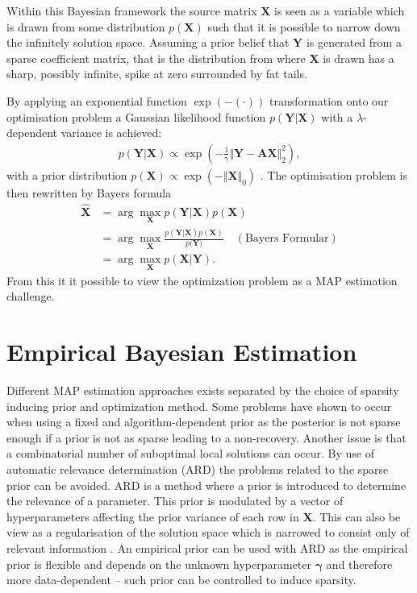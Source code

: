 Within this Bayesian framework the source matrix $\mathbf{X}$ is seen as a variable which is drawn from some distribution $p(\mathbf{X})$ such that it is possible to narrow down the infinitely solution space. 
Assuming a prior belief that $\textbf{Y}$ is generated from a sparse coefficient matrix, that is the distribution from where $\textbf{X}$ is drawn has a sharp, possibly infinite, spike at zero surrounded by fat tails.     

By applying an exponential function $\exp(- (\cdot))$ transformation onto our optimisation problem a Gaussian likelihood function $p(\mathbf{Y} \vert \mathbf{X})$ with a $\lambda$-dependent variance is achieved:
\begin{align*}
p(\mathbf{Y} \vert \mathbf{X}) \propto \exp \left( - \frac{1}{\gamma} \Vert \mathbf{Y} - \mathbf{AX} \Vert_2^2 \right),
\end{align*}
with a prior distribution $p(\mathbf{X}) \propto \exp(- \Vert \mathbf{X} \Vert_0)$ \cite[p. 137]{phd_wipf}. 
The optimisation problem is then rewritten by Bayers formula 
\begin{align*}
\hat{\mathbf{X}} &= \arg \max_{\mathbf{X}} p(\mathbf{Y} \vert \mathbf{X}) p(\mathbf{X}) \\
&= \arg \max_{\mathbf{X}} \frac{p(\mathbf{Y} \vert \mathbf{X}) p(\mathbf{X})}{p(\mathbf{Y)}} \quad (\text{Bayers Formular}) \\
&= \arg \max_{\mathbf{X}} p(\mathbf{X} \vert \mathbf{Y}).
\end{align*}
From this it it possible to view the optimization problem as a MAP estimation challenge.

\section{Empirical Bayesian Estimation}
Different MAP estimation approaches exists separated by the choice of sparsity inducing prior and optimization method. 
Some problems have shown to occur when using a fixed and algorithm-dependent prior as the posterior is not sparse enough if a prior is not as sparse leading to a non-recovery. 
Another issue is that a combinatorial number of suboptimal local solutions can occur.  
By use of automatic relevance determination (ARD) the problems related to the sparse prior can be avoided. 
ARD is a method where a prior is introduced to determine the relevance of a parameter. 
This prior is modulated by a vector of hyperparameters affecting the prior variance of each row in $\mathbf{X}$.
This can also be view as a regularisation of the solution space which is narrowed to consist only of relevant information \cite{ARD}.
An empirical prior can be used with ARD as the empirical prior is flexible and depends on the unknown hyperparameter $\boldsymbol{\gamma}$ and therefore more data-dependent -- such prior can be controlled to induce sparsity.

